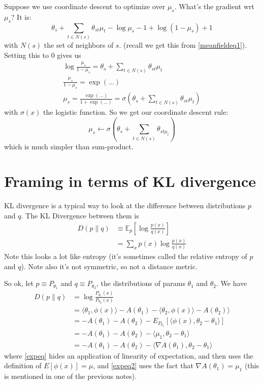 \documentclass{article}
\newcommand{\E}{\mathbb{E}}
\begin{document}
Suppose we use coordinate descent to optimize over $\mu_s$.
What's the gradient wrt $\mu_s$? It is:
$$
\theta_s  +
\sum_{t\in N(s)} \theta_{st}\mu_t
-
\log\mu_s - 1
+\log(1 - \mu_s) + 1
$$
with $N(s)$ the set of neighbors of $s$.
(recall we get this from \eqref{meanfieldeq1}).
Setting this to 0 gives us
\begin{align*}
\log\frac{\mu_s}{1 - \mu_s}
=
\theta_s + \sum_{t\in N(s) }\theta_{st} \mu_t
\\
\frac{\mu_s}{1 - \mu_s}
=
\exp(\dots)
\\
\mu_s = \frac{\exp(...)}{1 + \exp(...)} = \sigma(\theta_s + \sum_{t\in N(s)} \theta_{st} \mu_t)
\end{align*}
with $\sigma(x)$ the logistic function.
So we get our coordinate descent rule:
$$
\mu_s \leftarrow
\sigma(\theta_s + 
\sum_{t\in N(s)} \theta_{st \mu_t}
)
$$
which is much simpler than sum-product.

\section{Framing in terms of KL divergence}

KL divergence is a typical way to look at the difference between distributions $p$ and $q$.
The KL Divergence between them is
\begin{align}
D(p\| q)
&\equiv
\E_p\left[
\log\frac{p(x)}{q(x)}
\right]
\\
&=
\sum_x p(x) \log \frac{p(x)}{q(x)}
\end{align}
Note this looks a lot like entropy (it's sometimes called the relative entropy of $p$ and $q$).
Note also it's not symmetric, so not a distance metric.

So ok, let $p\equiv P_{\theta_1}$ and $q \equiv P_{\theta_2}$, the distributions of params $\theta_1$ and $\theta_2$.
We have
\begin{align}
D(p \| q)
&=
\log\frac{P_{\theta_1}(x)}{P_{\theta_2}(x)}
\\
&=
\langle \theta_1, \phi(x) \rangle - A(\theta_1)
-
\langle \theta_2, \phi(x) \rangle - A(\theta_2) \rangle
\\
&=
- A(\theta_1) - A(\theta_2)
-
E_{P_{\theta_1}}
\left[
\langle \phi(x), \theta_2 - \theta_1 \rangle
\right]
\\
&=
- A(\theta_1) - A(\theta_2)
-
\langle \mu_1, \theta_2 - \theta_1
\rangle
\label{expeq}
\\
&=
- A(\theta_1) - A(\theta_2)
-
\langle \nabla A(\theta_1), \theta_2 - \theta_1
\rangle
\label{expeq2}
\end{align}
where \eqref{expeq} hides an application of linearity of expectation, and then uses the definition
 of $E[\phi(x)] = \mu$, and \eqref{expeq2} uses the fact that $\nabla A(\theta_1) = \mu_1$ (this is mentioned in one of the previous notes).
\end{document}
